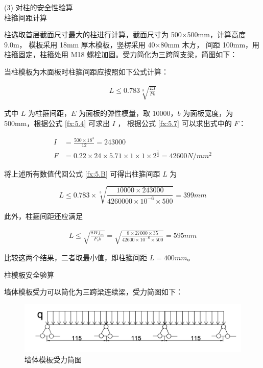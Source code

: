 (3) 对柱的安全性验算\\

 柱箍间距计算

柱选取首层截面尺寸最大的柱进行计算，截面尺寸为 500×500mm，计算高度 9.0m， 模板采用 18mm 厚木模板，竖楞采用 40×80mm 木方，
间距 100mm，用柱箍固定，柱箍处用 M18 螺栓加固。受力简化为三跨简支梁，简图如下：

当柱模板为木面板时柱箍间距应按照如下公式计算：

\begin{align}
    \label{fx:5.B}
    L \leq 0.783\sqrt[3]{\frac{EI}{Fb}}
\end{align}

式中 $L$ 为柱箍间距，$E$ 为面板的弹性模量，取 10000，$b$ 为面板宽度，为 500mm，根据公式 \ref{fx:5.4} 可求出 $I$ ，
根据公式 \ref{fx:5.7} 可以求出式中的 $F$：

\begin{align*}
I&=\frac{500\times 18^3}{12}=243000\\
F&=0.22\times 24\times 5.71\times 1\times 1\times 2^{\frac{1}{2}}=42600 N/mm^2
\end{align*}

将上述所有数值代回公式 \ref{fx:5.B} 可得出柱箍间距 $L$ 为

\[L \leq 0.783\times \sqrt[3]{\frac{10000\times 243000}{4260000\times 10^{-6}\times 500}}=399mm\]

此外，柱箍间距还应满足

\begin{align}
    \label{fx:5.C}
    L \leq \sqrt{\frac{8Wf_m}{F_sb}}=\sqrt{\frac{8\times 27000\times 35}{42600\times 10^{-6}\times 500}}=595 mm
\end{align}

比较这两个结果，二者取最小值，即柱箍间距 $L=400mm$。

 柱模板安全验算

墙体模板受力可以简化为三跨梁连续梁，受力简图如下：

\begin{figure}[thbp!]
    \centering
    \includegraphics[width=1.0\linewidth]{figure/c5f6.png}
    \caption{墙体模板受力简图}
    \label{fig:c5f6}
\end{figure}

